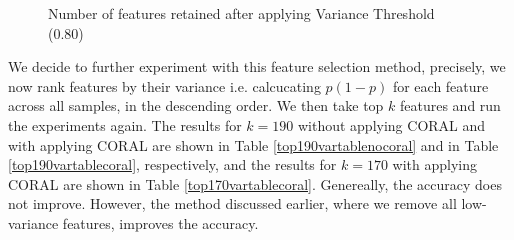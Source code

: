 \begin{figure}[ht]
\centering
\caption{Number of features retained after applying Variance Threshold (0.80)}
\label{featuresretained80figure}
\end{figure}

We decide to further experiment with this feature selection method, precisely, we now rank features by their variance i.e. calcucating $p(1-p)$ for each feature across all samples, in the descending order. We then take top $k$ features and run the experiments again. The results for $k = 190$ without applying CORAL and with applying CORAL are shown in Table \ref{top190vartablenocoral} and in Table \ref{top190vartablecoral}, respectively, and the results for $k = 170$ with applying CORAL are shown in Table \ref{top170vartablecoral}. Genereally, the accuracy does not improve. However, the method discussed earlier, where we remove all low-variance features, improves the accuracy. 

